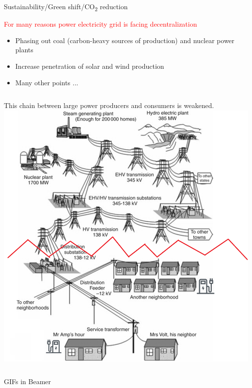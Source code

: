 \documentclass{beamer}
\begin{document}

\begin{frame}{Sustainability/Green shift/CO\textsubscript{2} reduction}
\begin{alertblock}{\textcolor{red}{For many reasons power electricity grid is facing decentralization}}
\begin{itemize}
\item Phasing out coal (carbon-heavy sources of production) and nuclear power plants
\item Increase penetration of solar and wind production
\item Many other points ...
\end{itemize}
\end{alertblock}
\begin{columns}
    This chain between large power producers and consumers is weakened.
\includegraphics[width=2 in , height=1.6 in]{Figures/EVchalendgebreak.png}
\end{columns}
\end{frame}

\begin{frame}{GIFs in Beamer}
\centering
{}
\end{frame}
\end{document}
